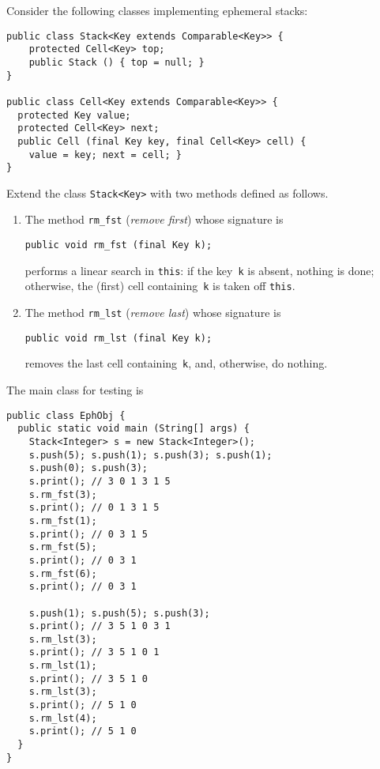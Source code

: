 \documentclass[11pt,a4paper]{article}
\author{Christian Rinderknecht}
\date{24 October 2013}
\begin{document}
\maketitle

\noindent Consider the following classes implementing ephemeral
stacks:
\begin{verbatim}
public class Stack<Key extends Comparable<Key>> {
    protected Cell<Key> top;
    public Stack () { top = null; }
}

public class Cell<Key extends Comparable<Key>> {
  protected Key value;
  protected Cell<Key> next;
  public Cell (final Key key, final Cell<Key> cell) {
    value = key; next = cell; }
}
\end{verbatim}
Extend the class \texttt{Stack<Key>} with two methods defined as follows.
\begin{enumerate}

  \item The method \texttt{rm\_fst} (\emph{remove first}) whose
  signature is
\begin{verbatim}
public void rm_fst (final Key k);
\end{verbatim}
  performs a linear search in \texttt{this}: if the key~\texttt{k} is
  absent, nothing is done; otherwise, the (first) cell
  containing~\texttt{k} is taken off \texttt{this}.

\item The method \texttt{rm\_lst} (\emph{remove last}) whose signature
  is
\begin{verbatim}
public void rm_lst (final Key k);
\end{verbatim}
removes the last cell containing~\texttt{k}, and, otherwise, do nothing.
\end{enumerate}

\newpage

\noindent The main class for testing is
\begin{verbatim}
public class EphObj {
  public static void main (String[] args) {
    Stack<Integer> s = new Stack<Integer>();
    s.push(5); s.push(1); s.push(3); s.push(1);
    s.push(0); s.push(3);
    s.print(); // 3 0 1 3 1 5
    s.rm_fst(3);
    s.print(); // 0 1 3 1 5
    s.rm_fst(1);
    s.print(); // 0 3 1 5
    s.rm_fst(5);
    s.print(); // 0 3 1
    s.rm_fst(6);
    s.print(); // 0 3 1

    s.push(1); s.push(5); s.push(3);
    s.print(); // 3 5 1 0 3 1
    s.rm_lst(3);
    s.print(); // 3 5 1 0 1
    s.rm_lst(1);
    s.print(); // 3 5 1 0
    s.rm_lst(3);
    s.print(); // 5 1 0
    s.rm_lst(4);
    s.print(); // 5 1 0
  }
}
\end{verbatim}
\end{document}
